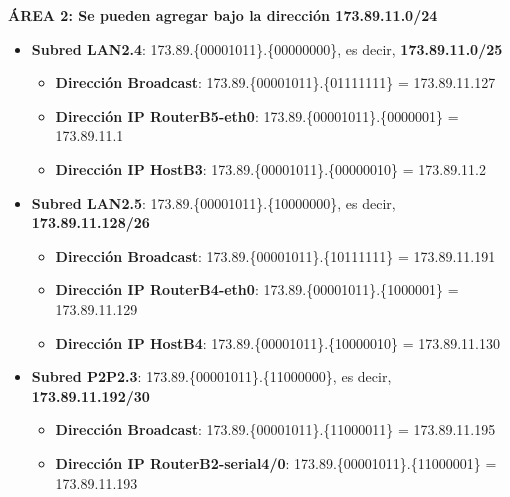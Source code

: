 \par \colorbox{lilaclaro}{\textbf{ÁREA 2: Se pueden agregar bajo la dirección 173.89.11.0/24}}
\begin{itemize}
	\item{\textbf{Subred LAN2.4}:} 173.89.\{\textcolor{azul}{000010}\textcolor{rojo}{11}\}.\{\textcolor{rojo}{0}0000000\}, es decir, \textbf{173.89.11.0/25}
		\begin{itemize}
			\item{\textbf{Dirección Broadcast}}: 173.89.\{\textcolor{azul}{000010}\textcolor{rojo}{11}\}.\{\textcolor{rojo}{0}1111111\} = 173.89.11.127
			\item{\textbf{Dirección IP RouterB5-eth0}}: 173.89.\{\textcolor{azul}{000010}\textcolor{rojo}{11}\}.\{\textcolor{rojo}{0}000001\} = 173.89.11.1
			\item{\textbf{Dirección IP HostB3}}: 173.89.\{\textcolor{azul}{000010}\textcolor{rojo}{11}\}.\{\textcolor{rojo}{0}0000010\} = 173.89.11.2
		\end{itemize}
	\item{\textbf{Subred LAN2.5}:} 173.89.\{\textcolor{azul}{000010}\textcolor{rojo}{11}\}.\{\textcolor{rojo}{10}000000\}, es decir, \textbf{173.89.11.128/26}
		\begin{itemize}
			\item{\textbf{Dirección Broadcast}}: 173.89.\{\textcolor{azul}{000010}\textcolor{rojo}{11}\}.\{\textcolor{rojo}{10}111111\} = 173.89.11.191
			\item{\textbf{Dirección IP RouterB4-eth0}}: 173.89.\{\textcolor{azul}{000010}\textcolor{rojo}{11}\}.\{\textcolor{rojo}{10}00001\} = 173.89.11.129
			\item{\textbf{Dirección IP HostB4}}: 173.89.\{\textcolor{azul}{000010}\textcolor{rojo}{11}\}.\{\textcolor{rojo}{10}000010\} = 173.89.11.130
		\end{itemize}
	\item{\textbf{Subred P2P2.3}:} 173.89.\{\textcolor{azul}{000010}\textcolor{rojo}{11}\}.\{\textcolor{rojo}{110000}00\}, es decir, \textbf{173.89.11.192/30}
		\begin{itemize}
			\item{\textbf{Dirección Broadcast}}: 173.89.\{\textcolor{azul}{000010}\textcolor{rojo}{11}\}.\{\textcolor{rojo}{110000}11\} = 173.89.11.195
			\item{\textbf{Dirección IP RouterB2-serial4/0}}: 173.89.\{\textcolor{azul}{000010}\textcolor{rojo}{11}\}.\{\textcolor{rojo}{110000}01\} = 173.89.11.193

\end{itemize}
\end{itemize}
